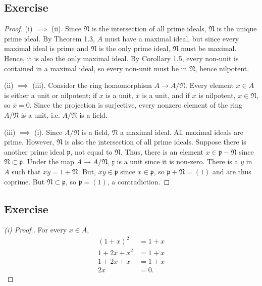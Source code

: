 \subsection{Exercise}\label{1.10}

\begin{proof}
(i) $\implies$ (ii). Since $\mathfrak{N}$ is the intersection of all prime ideals, $\mathfrak{N}$ is the unique prime ideal. By Theorem 1.3,
$A$ must have a maximal ideal, but since every maximal ideal is prime and $\mathfrak{N}$ is the only prime ideal, $\mathfrak{N}$ must
be maximal. Hence, it is also the only maximal ideal. By Corollary 1.5, every non-unit is contained in a maximal ideal, so every non-unit
must be in $\mathfrak{N}$, hence nilpotent.

(ii) $\implies$ (iii). Consider the ring homomorphism $A \to A/\mathfrak{N}$. Every element $x\in A$ is either a unit or nilpotent; if $x$ is a unit, 
$\overline{x}$ is a unit, and if $x$ is nilpotent, $x \in \mathfrak{N}$, so $\overline{x} = 0$. Since the projection is surjective, every nonzero element
of the ring $A/\mathfrak{N}$ is a unit, i.e. $A/\mathfrak{N}$ is a field.

(iii) $\implies$ (i). Since $A/\mathfrak{N}$ is a field, $\mathfrak{N}$ a maximal ideal. All maximal ideals are prime.
However, $\mathfrak{N}$ is also the intersection of all prime ideals. Suppose there is another prime ideal $\mathfrak{p}$, not equal to $\mathfrak{N}$.
Thus, there is an element $x \in \mathfrak{p} - \mathfrak{N}$ since $\mathfrak{N} \subset \mathfrak{p}$. Under the map $A \to A/\mathfrak{N}$,
$\mathfrak{x}$ is a unit since it is non-zero. There is a $y$ in $A$ such that $xy = 1 + \mathfrak{N}$. But, $xy \in \mathfrak{p}$ since $x \in \mathfrak{p}$,
so $\mathfrak{p} + \mathfrak{N} = (1)$ and are thus coprime. But $\mathfrak{N} \subset \mathfrak{p}$, so $\mathfrak{p} = (1)$, a contradiction.
\end{proof}

\subsection{Exercise}\label{1.11}

\begin{proof}[(i) Proof.]
For every $x \in A$, 
\begin{align*}
    (1 + x)^2 &= 1 + x \\
    1 + 2x + x^2 &= 1 + x \\
    1 + 2x + x &= 1 + x \\
    2x &= 0.
\end{align*}
\end{proof}

